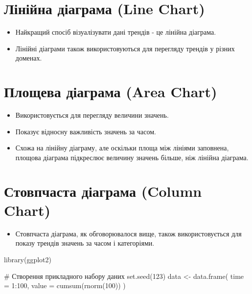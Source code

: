 \documentclass[
  letterpaper,
  DIV=11,
  numbers=noendperiod]{scrreprt}
\newenvironment{Shaded}{\begin{snugshade}}{\end{snugshade}}
\newcommand{\AttributeTok}[1]{\textcolor[rgb]{0.40,0.45,0.13}{#1}}
\newcommand{\CommentTok}[1]{\textcolor[rgb]{0.37,0.37,0.37}{#1}}
\newcommand{\DecValTok}[1]{\textcolor[rgb]{0.68,0.00,0.00}{#1}}
\newcommand{\FunctionTok}[1]{\textcolor[rgb]{0.28,0.35,0.67}{#1}}
\newcommand{\NormalTok}[1]{\textcolor[rgb]{0.00,0.23,0.31}{#1}}
\newcommand{\OtherTok}[1]{\textcolor[rgb]{0.00,0.23,0.31}{#1}}
\newcommand{\SpecialCharTok}[1]{\textcolor[rgb]{0.37,0.37,0.37}{#1}}
\providecommand{\tightlist}{%
  \setlength{\itemsep}{0pt}\setlength{\parskip}{0pt}}\usepackage{longtable,booktabs,array}
\begin{document}
\section{Лінійна діаграма (Line
Chart)}\label{ux43bux456ux43dux456ux439ux43dux430-ux434ux456ux430ux433ux440ux430ux43cux430-line-chart-1}

\begin{itemize}
\tightlist
\item
  Найкращий спосіб візуалізувати дані трендів - це лінійна діаграма.
\item
  Лінійні діаграми також використовуються для перегляду трендів у різних
  доменах.
\end{itemize}

\section{Площева діаграма (Area
Chart)}\label{ux43fux43bux43eux449ux435ux432ux430-ux434ux456ux430ux433ux440ux430ux43cux430-area-chart}

\begin{itemize}
\tightlist
\item
  Використовується для перегляду величини значень.
\item
  Показує відносну важливість значень за часом.
\item
  Схожа на лінійну діаграму, але оскільки площа між лініями заповнена,
  площова діаграма підкреслює величину значень більше, ніж лінійна
  діаграма.
\end{itemize}

\section{Стовпчаста діаграма (Column
Chart)}\label{ux441ux442ux43eux432ux43fux447ux430ux441ux442ux430-ux434ux456ux430ux433ux440ux430ux43cux430-column-chart}

\begin{itemize}
\tightlist
\item
  Стовпчаста діаграма, як обговорювалося вище, також використовується
  для показу трендів значень за часом і категоріями.
\end{itemize}

\begin{Shaded}
\begin{Highlighting}[]
\FunctionTok{library}\NormalTok{(ggplot2)}

\CommentTok{\# Створення прикладного набору даних}
\FunctionTok{set.seed}\NormalTok{(}\DecValTok{123}\NormalTok{)}
\NormalTok{data }\OtherTok{\textless{}{-}} \FunctionTok{data.frame}\NormalTok{(}
  \AttributeTok{time =} \DecValTok{1}\SpecialCharTok{:}\DecValTok{100}\NormalTok{,}
  \AttributeTok{value =} \FunctionTok{cumsum}\NormalTok{(}\FunctionTok{rnorm}\NormalTok{(}\DecValTok{100}\NormalTok{))}
\NormalTok{)}
\end{Highlighting}
\end{Shaded}
\end{document}
